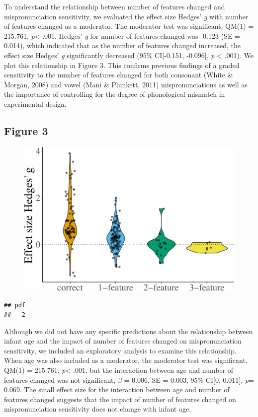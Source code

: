 \documentclass[man]{apa6}
\theoremstyle{definition}
\theoremstyle{definition}
\theoremstyle{definition}
\theoremstyle{remark}
\begin{document}
To understand the relationship between number of features changed and
mispronunciation sensitivity, we evaluated the effect size Hedges'
\emph{g} with number of features changed as a moderator. The moderator
test was significant, QM(1) = 215.761, \emph{p}\textless{} .001. Hedges'
\emph{g} for number of features changed was -0.123 (SE = 0.014), which
indicated that as the number of features changed increased, the effect
size Hedges' \emph{g} significantly decreased (95\% CI{[}-0.151,
-0.096{]}, \emph{p} \textless{} .001). We plot this relationship in
Figure 3. This confirms previous findings of a graded sensitivity to the
number of features changed for both consonant (White \& Morgan, 2008)
and vowel (Mani \& Plunkett, 2011) mispronunciations as well as the
importance of controlling for the degree of phonological mismatch in
experimental design.

\subsection{Figure 3}\label{figure-3}

\begin{figure}[htbp]
\centering
\includegraphics{Paper_Analyses_files/figure-latex/PlotFeatEffect-1.pdf}
\caption{}
\end{figure}

\begin{verbatim}
## pdf 
##   2
\end{verbatim}

Although we did not have any specific predictions about the relationship
between infant age and the impact of number of features changed on
mispronunciation sensitivity, we included an exploratory analysis to
examine this relationship. When age was also included as a moderator,
the moderator test was significant, QM(1) = 215.761, \emph{p}\textless{}
.001, but the interaction between age and number of features changed was
not significant, \(\beta\) = 0.006, SE = 0.003, 95\% CI{[}0, 0.011{]},
\emph{p}= 0.069. The small effect size for the interaction between age
and number of features changed suggests that the impact of number of
features changed on mispronunciation sensitivity does not change with
infant age.
\end{document}
